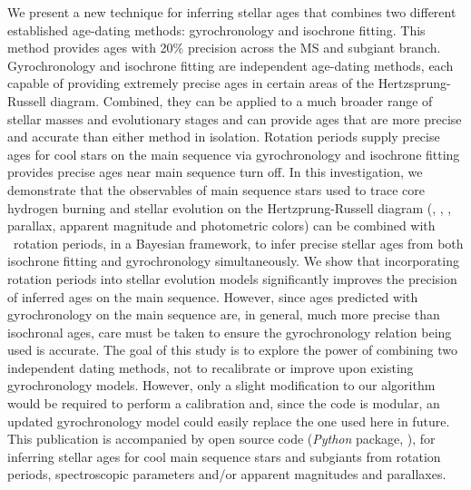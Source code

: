 We present a new technique for inferring stellar ages that combines two
different established age-dating methods: gyrochronology and isochrone
fitting.
This method provides ages with 20\% precision across the MS and subgiant
branch.
Gyrochronology and isochrone fitting are independent age-dating methods, each
capable of providing extremely precise ages in certain areas of the
Hertzsprung-Russell diagram.
Combined, they can be applied to a much broader range of stellar masses and
evolutionary stages and can provide ages that are more precise and accurate
than either method in isolation.
Rotation periods supply precise ages for cool stars on the main sequence via
gyrochronology and isochrone fitting provides precise ages near main sequence
turn off.
In this investigation, we demonstrate that the observables of main sequence
stars used to trace core hydrogen burning and stellar evolution on the
Hertzprung-Russell diagram (\teff, \feh, \logg, parallax, apparent magnitude
and photometric colors) can be combined with \kepler\ rotation periods, in a
Bayesian framework, to infer precise stellar ages from both isochrone fitting
and gyrochronology simultaneously.
We show that incorporating rotation periods into stellar evolution models
significantly improves the precision of inferred ages on the main sequence.
However, since ages predicted with gyrochronology on the main sequence are, in
general, much more precise than isochronal ages, care must be taken to ensure
the gyrochronology relation being used is accurate.
The goal of this study is to explore the power of combining two independent
dating methods, not to recalibrate or improve upon existing gyrochronology
models.
However, only a slight modification to our algorithm would be required to
perform a calibration and, since the code is modular, an updated
gyrochronology model could easily replace the one used here in future.
This publication is accompanied by open source code ({\it Python} package,
\sd), for inferring stellar ages for cool main sequence stars and subgiants
from rotation periods, spectroscopic parameters and/or apparent magnitudes and
parallaxes.
